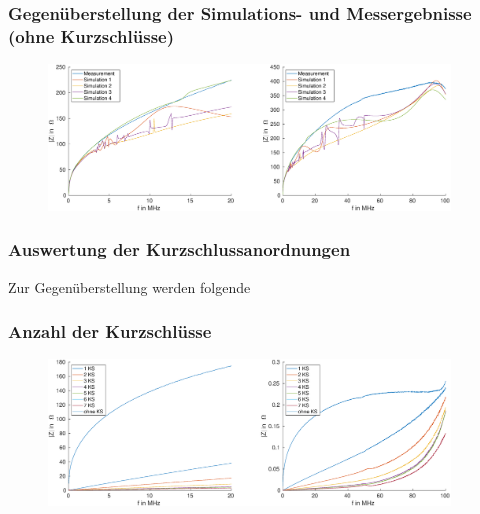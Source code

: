 \documentclass[accentcolor=tud9b, colorbacktitle, inverttitle]{tudbeamer}
\begin{document}
% 



\begin{frame}\frametitle{Gegen\"uberstellung der Simulations- und Messergebnisse (ohne Kurzschl\"usse)}
\vspace{-1em}
\begin{figure}[h]
	\centering
	\includegraphics[width=0.95\textwidth]{Zges_RK_SimMeas}
\end{figure}
\end{frame}


\begin{frame}\frametitle{Auswertung der Kurzschlussanordnungen}
Zur Gegen\"uberstellung werden folgende 

\end{frame}



\begin{frame}\frametitle{Anzahl der Kurzschl\"usse}
\vspace{-1em}
\begin{figure}[h]
	\centering
	\includegraphics[width=0.95\textwidth]{impedance_numberKS_ringcore}
\end{figure}
\end{frame}
\end{document}
